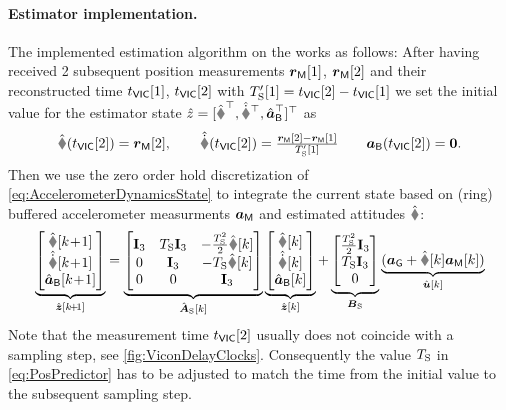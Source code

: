 \paragraph{Estimator implementation.}
The implemented estimation algorithm on the \microcontroller works as follows:
After having received 2 subsequent position measurements $\boldsymbol{r}_{\mathsf{M}}[1]$, $\boldsymbol{r}_{\mathsf{M}}[2]$ and their reconstructed time $t_{\mathsf{VIC}}[1]$, $t_{\mathsf{VIC}}[2]$ with $T_{\mathrm{S}}'[1]=t_{\mathsf{VIC}}[2]-t_{\mathsf{VIC}}[1]$ we set the initial value for the estimator state $\hat{z} = [\rObs^\top, \rdObs^\top, \aIMUBObs^\top]^\top$ as
\begin{align}
 \rObs(\tVIC[2]) = \rVIC[2], 
\qquad
 \rdObs(\tVIC[2]) = \tfrac{\rVIC[2]-\rVIC[1]}{\Ts'[1]}
\qquad
 \aIMUB(\tVIC[2]) = \tuple{0}.
\end{align}
Then we use the zero order hold discretization of \eqref{eq:AccelerometerDynamicsState} to integrate the current state based on (ring) buffered accelerometer measurments $\boldsymbol{a}_{\mathsf{M}}$ and estimated attitudes $\RObs$:
\begin{align}\label{eq:PosPredictor}
 \underbrace{\begin{bmatrix} \rObs[\kPlusOne] \\ \rdObs[\kPlusOne] \\ \aIMUBObs[\kPlusOne] \end{bmatrix}}_{\hat{\tuple{z}}[\kPlusOne]}
 =
 \underbrace{\begin{bmatrix} \idMat[3] & \Ts\idMat[3] & -\tfrac{\Ts^2}{2}\RObs[k] \\ 0 & \idMat[3] & -\Ts\RObs[k] \\ 0 & 0 & \idMat[3] \end{bmatrix}}_{\hat{\mat{A}}_\idxSamp[k]}
 \underbrace{\begin{bmatrix} \rObs[k] \\ \rdObs[k] \\ \aIMUBObs[k] \end{bmatrix}}_{\hat{\tuple{z}}[k]}
 +
 \underbrace{\begin{bmatrix} \tfrac{\Ts^2}{2}\idMat[3] \\ \Ts \idMat[3] \\ 0 \end{bmatrix}}_{\mat{B}_\idxSamp}
 \underbrace{(\gravityAcc + \RObs[k] \aIMU[k])}_{\hat{\tuple{u}}[k]}
\end{align}
Note that the measurement time $t_{\mathsf{VIC}}[2]$ usually does not coincide with a sampling step, see \autoref{fig:ViconDelayClocks}.
Consequently the value $T_{\mathrm{S}}$ in \eqref{eq:PosPredictor} has to be adjusted to match the time from the initial value to the subsequent sampling step.

